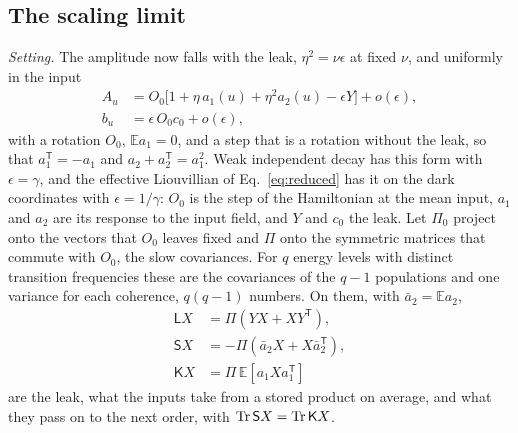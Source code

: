 \subsection{The scaling limit}
\label{app:gentle}
\emph{Setting.} The amplitude now falls with the leak, $\eta^2=\nu\epsilon$ at fixed $\nu$, and uniformly in the input
\begin{equation}
  \begin{aligned}
    A_u&=O_0\bigl[1+\eta\,a_1(u)+\eta^2a_2(u)-\epsilon Y\bigr]+o(\epsilon),\\
    b_u&=\epsilon\,O_0c_0+o(\epsilon),
  \end{aligned}
  \label{eq:gentleform}
\end{equation}
with a rotation $O_0$, $\mathbb Ea_1=0$, and a step that is a rotation without the leak, so that
$a_1^{\mathsf T}=-a_1$ and $a_2+a_2^{\mathsf T}=a_1^2$. Weak independent decay has this form with $\epsilon=\gamma$,
and the effective Liouvillian of Eq.~\eqref{eq:reduced} has it on the dark coordinates with $\epsilon=1/\gamma$:
$O_0$ is the step of the Hamiltonian at the mean input, $a_1$ and $a_2$ are its response to the input field, and $Y$
and $c_0$ the leak. Let $\Pi_0$ project onto the vectors that $O_0$ leaves fixed and $\Pi$ onto the symmetric matrices
that commute with $O_0$, the slow covariances. For $q$ energy levels with distinct transition frequencies these are
the covariances of the $q-1$ populations and one variance for each coherence, $q(q-1)$ numbers. On them, with
$\bar a_2=\mathbb Ea_2$,
\begin{equation}
  \begin{aligned}
    \mathsf LX&=\Pi(YX+XY^{\mathsf T}),\\
    \mathsf SX&=-\Pi(\bar a_2X+X\bar a_2^{\mathsf T}),\\
    \mathsf KX&=\Pi\,\mathbb E[a_1Xa_1^{\mathsf T}]
  \end{aligned}
  \label{eq:slowmaps}
\end{equation}
are the leak, what the inputs take from a stored product on average, and what they pass on to the next order, with
$\operatorname{Tr}\mathsf SX=\operatorname{Tr}\mathsf KX$.

